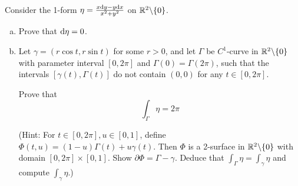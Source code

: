 \documentclass[a4paper, 12pt]{article}
\begin{document}
\begin{problem} 
Consider the 1-form $\eta = \frac{x \mathrm{d} y - y \mathrm{d} x}{x^2 + y^2}$ on $\mathbb{R}^2 \backslash \{0\}$.

\begin{enumerate} [(a)]
\item Prove that $\mathrm{d} \eta = 0$.
\item Let $\gamma = (r \cos t, r \sin t)$ for some $r > 0$, and let $\Gamma$ be $C^1$-curve in $\mathbb{R}^2 \backslash \{0\}$ with parameter interval $[0, 2\pi]$ and $\Gamma(0) = \Gamma(2 \pi)$, such that the intervals $[\gamma(t), \Gamma(t)]$ do not contain $(0, 0)$ for any $t \in [0, 2\pi]$.

Prove that \[
\int_{\Gamma} \eta = 2\pi
\]

(Hint: For $t \in [0, 2\pi], u \in [0, 1]$, define $\Phi(t, u) = (1-u) \Gamma(t) + u \gamma(t)$. Then $\Phi$ is a 2-surface in $\mathbb{R}^2 \backslash \{0\}$ with domain $[0, 2\pi] \times [0, 1]$. Show $\partial \Phi = \Gamma - \gamma$. Deduce that $\int_{\Gamma} \eta = \int_{\gamma} \eta$ and compute $\int_{\gamma} \eta$.)
\end{enumerate}
\end{problem}
\end{document}
